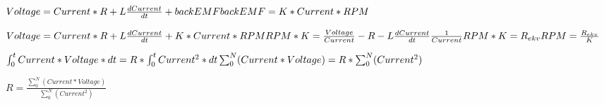$Voltage = Current * R + L \frac{dCurrent}{dt} + backEMF\\
\\
backEMF = K*Current*RPM$


$Voltage = Current * R + L \frac{dCurrent}{dt} + K * Current * RPM\\
\\
RPM*K = \frac{Voltage}{Current} - R - L \frac{dCurrent}{dt} \frac{1}{Current}\\
\\
RPM*K = R_{ekv}\\
\\
RPM = \frac{R_{ekv}}{K}$


$\int_{0}^{t} Current*Voltage*dt = R *\int_{0}^{t} Current^2 *dt \\
\\
\sum_{0}^{N} (Current*Voltage) = R * \sum_{0}^{N} (Current^2)$

$R = \frac{\sum_{0}^{N} (Current*Voltage)}{\sum_{0}^{N} (Current^2)}$
